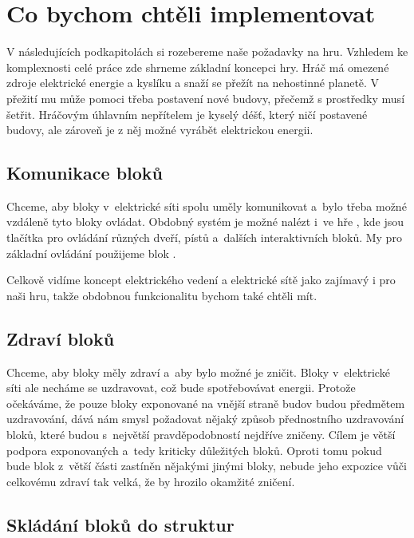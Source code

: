 


\section{Co bychom chtěli implementovat}

V následujících podkapitolách si rozebereme naše požadavky na hru. Vzhledem ke komplexnosti celé práce zde shrneme základní koncepci hry. Hráč má omezené zdroje elektrické energie a kyslíku a snaží se přežít na nehostinné planetě. V přežití mu může pomoci třeba postavení nové budovy, přečemž s prostředky musí šetřit. Hráčovým úhlavním nepřítelem je kyselý déšť, který ničí postavené budovy, ale zároveň je z něj možné vyrábět elektrickou energii. 







\subsection{Komunikace bloků}

Chceme, aby bloky v~elektrické síti spolu uměly komunikovat a~bylo třeba možné vzdáleně tyto bloky ovládat. Obdobný systém je možné nalézt i~ve hře \SE{}, kde jsou tlačítka pro ovládání různých dveří, pístů a~dalších interaktivních bloků. My pro základní ovládání použijeme blok .


Celkově vidíme koncept elektrického vedení a elektrické sítě jako zajímavý i pro naši hru, takže obdobnou funkcionalitu bychom také chtěli mít.



\subsection{Zdraví bloků}
Chceme, aby bloky měly zdraví a~aby bylo možné je zničit. Bloky v~elektrické síti ale necháme se uzdravovat, což bude spotřebovávat energii. Protože očekáváme, že pouze bloky exponované na vnější straně budov budou předmětem uzdravování, dává nám smysl požadovat nějaký způsob přednostního uzdravování bloků, které budou s~největší pravděpodobností nejdříve zničeny. Cílem je větší podpora exponovaných a~tedy kriticky důležitých bloků. Oproti tomu pokud bude blok z~větší části zastíněn nějakými jinými bloky, nebude jeho expozice vůči celkovému zdraví tak velká, že by hrozilo okamžité zničení.

\subsection{Skládání bloků do struktur}

